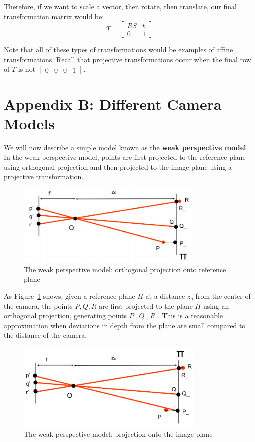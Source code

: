 \documentclass[a4paper, 12pt]{article}
\renewcommand\emph{\textbf}
\begin{document}
Therefore, if we want to scale a vector, then rotate, then translate, our final transformation matrix would be:
\[T = \begin{bmatrix}
RS & t \\ 0 & 1
\end{bmatrix}\]

Note that all of these types of transformations would be examples of affine transformations. Recall that projective transformations occur when the final row of $T$ is not $\begin{bmatrix}
0 & 0 &0 &1
\end{bmatrix}$.

\section{Appendix B: Different Camera Models}
We will now describe a simple model known as the \emph{weak perspective model}. In the weak perspective model, points are first projected to the reference plane using orthogonal projection and then projected to the image plane using a projective transformation.
\begin{figure}[h!]
\centering
\includegraphics[width=0.8\textwidth]{figures/weak_perspective.png}
\caption{The weak perspective model: orthogonal projection onto reference plane}
\label{fig:weak_perspective}
\end{figure}

As Figure~\ref{fig:weak_perspective} shows, given a reference plane $\Pi$ at a distance $z_o$ from the center of the camera, the points $P,Q,R$ are first projected to the plane $\Pi$ using an orthogonal projection, generating points $P\_, Q\_, R\_$.  This is a reasonable approximation when deviations in depth from the plane are small compared to the distance of the camera. 

\begin{figure}[h!]
\centering
\includegraphics[width=0.8\textwidth]{figures/weak_perspective2.png}
\caption{The weak perspective model: projection onto the image plane}
\label{fig:weak_perspective2}
\end{figure}
\end{document}
